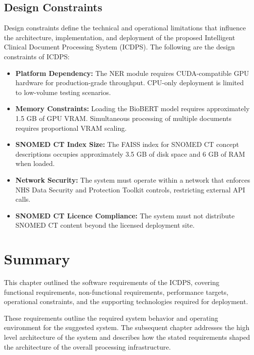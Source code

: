 \subsection{Design Constraints}
Design constraints define the technical and operational limitations that influence the architecture, implementation, and deployment of the proposed Intelligent Clinical Document Processing System (ICDPS). The following are the design constraints of ICDPS:
\begin{itemize}
    \item \textbf{Platform Dependency:} The NER module requires CUDA-compatible GPU hardware for production-grade throughput. CPU-only deployment is limited to low-volume testing scenarios.
    \item \textbf{Memory Constraints:} Loading the BioBERT model requires approximately 1.5 GB of GPU VRAM. Simultaneous processing of multiple documents requires proportional VRAM scaling.
    \item \textbf{SNOMED CT Index Size:} The FAISS index for SNOMED CT concept descriptions occupies approximately 3.5 GB of disk space and 6 GB of RAM when loaded.
    \item \textbf{Network Security:} The system must operate within a network that enforces NHS Data Security and Protection Toolkit controls, restricting external API calls.
    \item \textbf{SNOMED CT Licence Compliance:} The system must not distribute SNOMED CT content beyond the licensed deployment site.
\end{itemize}

\section*{Summary}

This chapter outlined the software requirements of the ICDPS, covering functional requirements, non-functional requirements, performance targets, operational constraints, and the supporting technologies required for deployment. 

These requirements outline the required system behavior and operating environment for the suggested system. The subsequent chapter addresses the high level architecture of the system and describes how the stated requirements shaped the architecture of the overall processing infrastructure.
